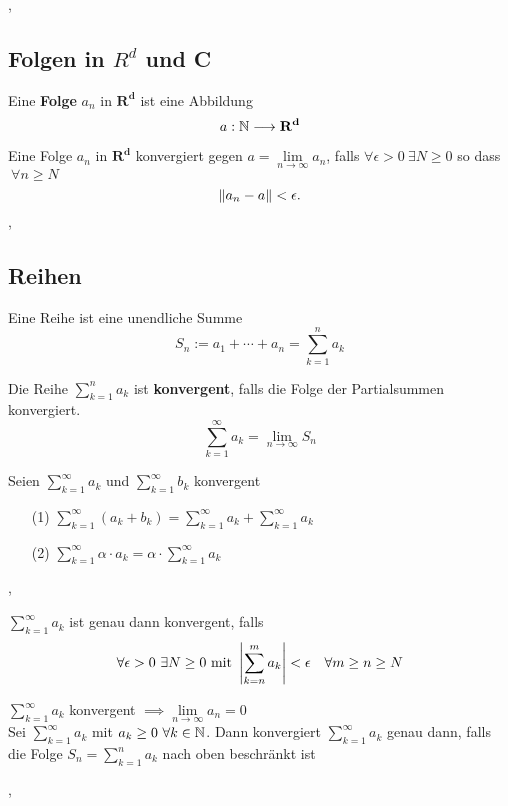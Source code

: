 \sep

\subsection{Folgen in $R^{d}$ und C}

\Def[2.6.1] Eine \textbf{Folge} $a_n$ in $\mathbf{R^{d}}$ ist eine Abbildung
\[
a: \mathbb{N}\longrightarrow \mathbf{R^{d}}
\] 

\Def[2.6.2] Eine Folge $a_n$ in $\mathbf{R^{d}}$ konvergiert gegen ${a = \lim\limits_{n \rightarrow \infty} a_{n}}$, falls $ \forall \epsilon > 0 \ \exists N \geq 0$ so dass $\ \forall n\geq N$
\[
 \left\lVert a_n-a \right\rVert < \epsilon.
\]
\sep

\subsection{Reihen}

\Def[2.7.0] Eine Reihe ist eine unendliche Summe
\[S_{n} := a_{1}  + \cdots + a_{n} = \sum_{k=1}^{n} a_{k}\]

\Def[2.7.1] Die Reihe $\sum_{k=1}^{n} a_{k}$ ist \textbf{konvergent}, falls die Folge der Partialsummen konvergiert. 
\[\sum_{k=1}^{\infty} a_{k} = \lim\limits_{n \rightarrow \infty} S_{n} \]

\Satz[2.7.4] Seien $\sum_{k=1}^{\infty} a_{k}$ und $\sum_{k=1}^{\infty} b_{k}$ konvergent
\begin{enumerate}
\item[(1)] $\sum_{k=1}^{\infty} (a_{k} + b_{k}) = \sum_{k=1}^{\infty} a_{k} + \sum_{k=1}^{\infty} a_{k}$ 
\item[(2)] $\sum_{k=1}^{\infty} \alpha \cdot a_{k} = \alpha \cdot \sum_{k=1}^{\infty} a_{k}$
\end{enumerate}

\sep

 $\sum_{k=1}^{\infty} a_{k}$ ist genau dann konvergent, falls
\[ \forall \epsilon > 0 \ \exists N \geq 0 \text{ mit } \left\lvert \sum_{k=n}^{m} a_{k} \right\rvert < \epsilon \quad \forall m \geq n \geq N\] 

\Bem $\sum_{k=1}^{\infty} a_{k}$ konvergent $\implies  \lim\limits_{n \rightarrow \infty} a_{n} = 0$ \\

\Satz[2.7.6] Sei $\sum_{k=1}^{\infty} a_{k}$ mit $a_{k} \geq  0 \ \forall k \in \mathbb{N}$. Dann konvergiert
$\sum_{k=1}^{\infty} a_{k}$ genau dann, falls die Folge $S_{n} = \sum_{k=1}^{n} a_{k}$ nach oben beschränkt ist

\sep

